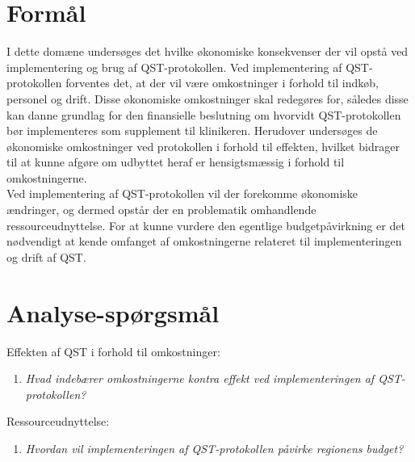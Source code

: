\section{Formål}
I dette domæne undersøges det hvilke økonomiske konsekvenser der vil opstå ved implementering og brug af QST-protokollen. Ved implementering af QST-protokollen forventes det, at der vil være omkostninger i forhold til indkøb, personel og drift. Disse økonomiske omkostninger skal redegøres for, således disse kan danne grundlag for den finansielle beslutning om hvorvidt QST-protokollen bør implementeres som supplement til klinikeren. Herudover undersøges de økonomiske omkostninger ved protokollen i forhold til effekten, hvilket bidrager til at kunne afgøre om udbyttet heraf er hensigtsmæssig i forhold til omkostningerne. \\
Ved implementering af QST-protokollen vil der forekomme økonomiske ændringer, og dermed opstår der en problematik omhandlende ressourceudnyttelse. For at kunne vurdere den egentlige budgetpåvirkning er det nødvendigt at kende omfanget af omkostningerne relateret til implementeringen og drift af QST. 

\section{Analyse-spørgsmål}
Effekten af QST i forhold til omkostninger:
\begin{enumerate}
	\item \textit{Hvad indebærer omkostningerne kontra effekt ved implementeringen af QST-protokollen?}
\end{enumerate}

Ressourceudnyttelse:
\begin{enumerate}[resume]
	\item \textit{Hvordan vil implementeringen af QST-protokollen påvirke regionens budget?} %
\end{enumerate}


